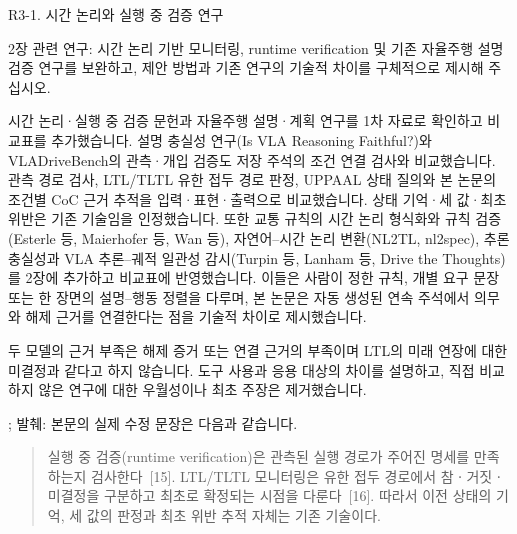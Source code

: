 




\clearpage

\begin{reviewitem}{R3-1. 시간 논리와 실행 중 검증 연구}

\begin{reviewercomment}

2장 관련 연구: 시간 논리 기반 모니터링, runtime verification 및 기존 자율주행 설명 검증 연구를 보완하고, 제안 방법과 기존 연구의 기술적 차이를 구체적으로 제시해 주십시오.

\end{reviewercomment}

\begin{authorresponse}

시간 논리·실행 중 검증 문헌과 자율주행 설명·계획 연구를 1차 자료로 확인하고 비교표를 추가했습니다. 설명 충실성 연구(Is VLA Reasoning Faithful?)와 VLADriveBench의 관측·개입 검증도 저장 주석의 조건 연결 검사와 비교했습니다. 관측 경로 검사, LTL/TLTL 유한 접두 경로 판정, UPPAAL 상태 질의와 본 논문의 조건별 CoC 근거 추적을 입력·표현·출력으로 비교했습니다. 상태 기억·세 값·최초 위반은 기존 기술임을 인정했습니다. 또한 교통 규칙의 시간 논리 형식화와 규칙 검증(Esterle 등, Maierhofer 등, Wan 등), 자연어–시간 논리 변환(NL2TL, nl2spec), 추론 충실성과 VLA 추론–궤적 일관성 감시(Turpin 등, Lanham 등, Drive the Thoughts)를 2장에 추가하고 비교표에 반영했습니다. 이들은 사람이 정한 규칙, 개별 요구 문장 또는 한 장면의 설명–행동 정렬을 다루며, 본 논문은 자동 생성된 연속 주석에서 의무와 해제 근거를 연결한다는 점을 기술적 차이로 제시했습니다.

두 모델의 근거 부족은 해제 증거 또는 연결 근거의 부족이며 LTL의 미래 연장에 대한 미결정과 같다고 하지 않습니다. 도구 사용과 응용 대상의 차이를 설명하고, 직접 비교하지 않은 연구에 대한 우월성이나 최초 주장은 제거했습니다.

\end{authorresponse}

\begin{manuscriptrevision}{; 발췌: }
본문의 실제 수정 문장은 다음과 같습니다.

\begin{quote}
실행 중 검증(runtime verification)은 관측된 실행 경로가 주어진 명세를 만족하는지 검사한다~[15]. LTL/TLTL 모니터링은 유한 접두 경로에서 참ㆍ거짓ㆍ미결정을 구분하고 최초로 확정되는 시점을 다룬다~[16]. 따라서 이전 상태의 기억, 세 값의 판정과 최초 위반 추적 자체는 기존 기술이다.
\end{quote}
\end{manuscriptrevision}

\end{reviewitem}

